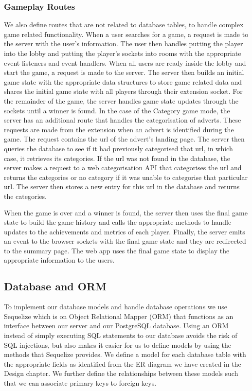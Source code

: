 \documentclass{l4proj}
\begin{document}
\subsubsection{Gameplay Routes}
We also define routes that are not related to database tables, to handle complex game related functionality. When a user searches for a game, a request is made to the server with the user's information. The user then handles putting the player into the lobby and putting the player's sockets into rooms with the appropriate event listeners and event handlers. When all users are ready inside the lobby and start the game, a request is made to the server. The server then builds an initial game state with the appropriate data structures to store game related data and shares the initial game state with all players through their extension socket. For the remainder of the game, the server handles game state updates through the sockets until a winner is found. In the case of the Category game mode, the server has an additional route that handles the categorisation of adverts. These requests are made from the extension when an advert is identified during the game. The request contains the url of the advert's landing page. The server then queries the database to see if it had previously categorised that url, in which case, it retrieves its categories. If the url was not found in the database, the server makes a request to a web categorisation API that categorises the url and returns the categories or no category if it was unable to categorise that particular url. The server then stores a new entry for this url in the database and returns the categories.

When the game is over and a winner is found, the server then uses the final game state to build the game history and calls the appropriate methods to handle updates to the achievements and metrics of each player. Finally, the server emits an event to the browser sockets with the final game state and they are redirected to the summary page. The web app uses the final game state to display the appropriate information to the users.    


\subsection{Database and ORM}
To implement our database models and handle database operations we use Sequelize which is on Object Relational Mapper (ORM) that functions as an interface between our server and our PostgreSQL database. Using an ORM instead of simply executing SQL statements to our database avoids the risk of SQL injections, but also makes it easier for us to define models by using the methods that Sequelize provides. We define a model for each database table with the appropriate fields as identified from the ER diagram we have created in the Design chapter. We further define the relationships between these models such that we can associate primary keys to foreign keys.
\end{document}
